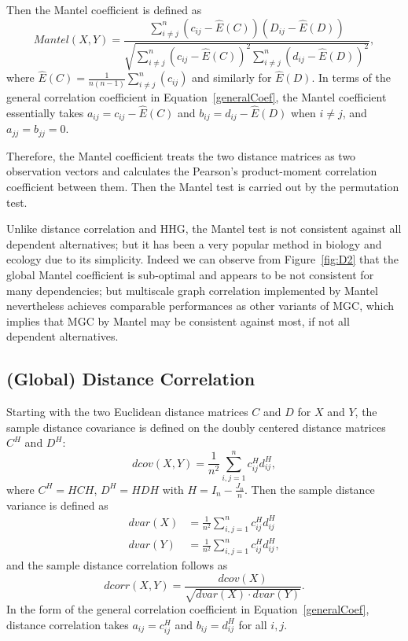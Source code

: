\documentclass[11pt]{article}
\begin{document}
Then the Mantel coefficient \cite{Mantel1967} is defined as 
\begin{equation}
Mantel(X,Y)=\frac{\sum_{i \neq j}^{n}(c_{ij}-\hat{E}(C))(D_{ij}-\hat{E}(D))}{\sqrt{\sum_{i \neq j}^{n}(c_{ij}-\hat{E}(C))^2 \sum_{i \neq j}^{n}(d_{ij}-\hat{E}(D))^2}},
\end{equation}
where $\hat{E}(C)=\frac{1}{n(n-1)}\sum_{i \neq j}^{n}(c_{ij})$ and similarly for $\hat{E}(D)$. In terms of the general correlation coefficient in Equation~\ref{generalCoef}, the Mantel coefficient essentially takes $a_{ij}=c_{ij}-\hat{E}(C)$ and $b_{ij}=d_{ij}-\hat{E}(D)$ when $i \neq j$, and $a_{jj}=b_{jj}=0$.

Therefore, the Mantel coefficient treats the two distance matrices as two observation vectors and calculates the Pearson's product-moment correlation coefficient between them. Then the Mantel test is carried out by the permutation test.

Unlike distance correlation and HHG, the Mantel test is not consistent against all dependent alternatives; but it has been a very popular method in biology and ecology due to its simplicity. Indeed we can observe from Figure~\ref{fig:D2} that the global Mantel coefficient is sub-optimal and appears to be not consistent for many dependencies; but multiscale graph correlation implemented by Mantel nevertheless achieves comparable performances as other variants of MGC, which implies that MGC by Mantel may be consistent against most, if not all dependent alternatives.

\subsection{(Global) Distance Correlation}
\label{main1}
Starting with the two Euclidean distance matrices $C$ and $D$ for $X$ and $Y$, the sample distance covariance is defined on the doubly centered distance matrices $C^{H}$ and $D^{H}$:
\begin{equation}
\label{dcovEqu}
dcov(X,Y)=\frac{1}{n^2}\sum_{i,j=1}^{n}c^{H}_{ij}d^{H}_{ij},
\end{equation}
where $C^{H}=HCH$, $D^{H}=HDH$ with $H=I_{n}-\frac{J_{n}}{n}$. Then the sample distance variance is defined as
\begin{align*}
dvar(X) &=\frac{1}{n^2}\sum_{i,j=1}^{n}c^{H}_{ij}d^{H}_{ij}\\
dvar(Y) &=\frac{1}{n^2}\sum_{i,j=1}^{n}c^{H}_{ij}d^{H}_{ij},
\end{align*}
and the sample distance correlation follows as
\begin{equation}
\label{dcorrEqu}
dcorr(X,Y)=\frac{dcov(X)}{\sqrt{dvar(X) \cdot dvar(Y)}}.
\end{equation}
In the form of the general correlation coefficient in Equation~\ref{generalCoef}, distance correlation takes $a_{ij}=c^{H}_{ij}$ and $b_{ij}=d^{H}_{ij}$ for all $i,j$.
\end{document}
